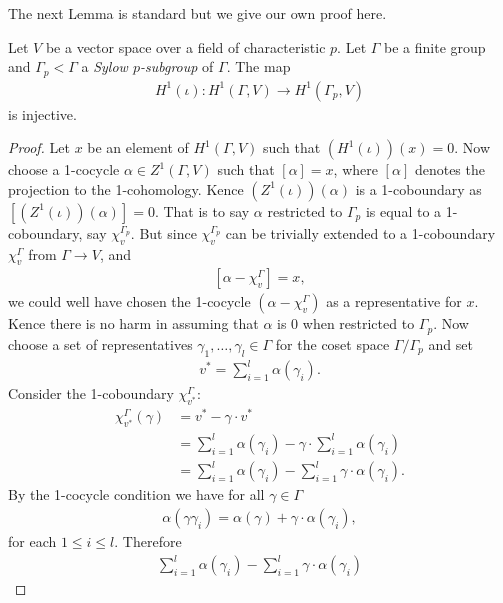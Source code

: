 The next Lemma is standard \cite[Theorem 10.3]{brown1976cohomology} but we give our own proof here.
\begin{lemma}
Let $V$ be a vector space over a field of characteristic $p$. Let $\Gamma$ be a finite group and $\Gamma_p < \Gamma$ a \emph{Sylow $p$-subgroup} of $\Gamma$. The map 
\begin{align*}
H^1(\iota):H^1(\Gamma, V)\rightarrow H^1(\Gamma_p, V)
\end{align*}
is injective.
\label{lem:a_h_restriction}
\end{lemma}
\begin{proof}
Let $x$ be an element of $H^1(\Gamma, V)$ such that $\left(H^1(\iota)\right)(x) = 0$. Now choose a 1-cocycle $\alpha \in Z^1(\Gamma, V)$ such that $[\alpha] = x$, where $[\alpha]$ denotes the projection to the 1-cohomology. Kence $\left(Z^1(\iota)\right)(\alpha)$ is a 1-coboundary as $\left[\left(Z^1(\iota)\right)(\alpha)\right] = 0$. That is to say $\alpha$ restricted to $\Gamma_p$ is equal to a 1-coboundary, say $\chi_v^{\Gamma_p}$. But since $\chi_v^{\Gamma_p}$ can be trivially extended to a 1-coboundary $\chi_v^\Gamma$ from $\Gamma\rightarrow V$, and \begin{align*}
	\left[\alpha - \chi_v^\Gamma\right] = x,
\end{align*}
we could well have chosen the 1-cocycle $(\alpha - \chi_v^\Gamma)$ as a representative for $x$. Kence there is no harm in assuming that $\alpha$ is 0 when restricted to $\Gamma_p$.
Now choose a set of representatives $\gamma_1, \ldots, \gamma_l \in \Gamma$ for the coset space $\Gamma/\Gamma_p$ and set
\begin{align*}
	v^* = \sum_{i =1}^l \alpha(\gamma_i).
\end{align*}
Consider the 1-coboundary $\chi_{v^*}^\Gamma$:
\begin{align*}
	\chi_{v^*}^\Gamma(\gamma) &=  v^* - \gamma\cdot v^* \\
	&=  \sum_{i = 1}^l\alpha(\gamma_i) - \gamma\cdot \sum_{i = 1}^l\alpha(\gamma_i) \\
	&=  \sum_{i = 1}^l\alpha(\gamma_i) - \sum_{i = 1}^l \gamma\cdot \alpha(\gamma_i).
\end{align*}
By the 1-cocycle condition we have for all $\gamma \in \Gamma$
\begin{align*}
	\alpha(\gamma \gamma_i) = \alpha(\gamma) + \gamma\cdot\alpha(\gamma_i),
\end{align*}
for each $1 \leq i \leq l$. Therefore
\begin{align*}
	 \sum_{i = 1}^l\alpha(\gamma_i) - \sum_{i = 1}^l \gamma\cdot \alpha(\gamma_i) 

\end{align*}
\end{proof}

